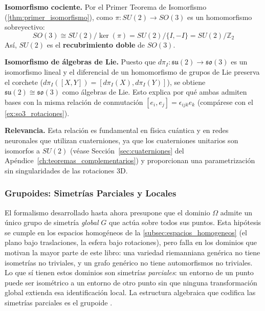\begin{example}
\textbf{Isomorfismo cociente.}
Por el Primer Teorema de Isomorfismo (\autoref{thm:primer_isomorfismo}), como $\pi: SU(2) \to SO(3)$ es un homomorfismo sobreyectivo:
\begin{equation}\label{eq:su2_z2_so3}
	SO(3) \cong SU(2)/\ker(\pi) = SU(2)/\{I, -I\} = SU(2)/\mathbb{Z}_2
\end{equation}
Así, $SU(2)$ es el \textbf{recubrimiento doble} de $SO(3)$.

\textbf{Isomorfismo de álgebras de Lie.}
Puesto que $d\pi_I: \mathfrak{su}(2) \to \mathfrak{so}(3)$ es un isomorfismo lineal y el diferencial de un homomorfismo de grupos de Lie preserva el corchete ($d\pi_I([X,Y]) = [d\pi_I(X), d\pi_I(Y)]$), se obtiene $\mathfrak{su}(2) \cong \mathfrak{so}(3)$ como álgebras de Lie. Esto explica por qué ambas admiten bases con la misma relación de conmutación $[e_i, e_j] = \epsilon_{ijk}e_k$ (compárese con el \autoref{ex:so3_rotaciones}).

\textbf{Relevancia.}
Esta relación es fundamental en física cuántica y en redes neuronales que utilizan cuaterniones, ya que los cuaterniones unitarios son isomorfos a $SU(2)$ (véase Sección~\ref{sec:cuaterniones} del Apéndice~\ref{ch:teoremas_complementarios}) y proporcionan una parametrización sin singularidades de las rotaciones 3D.
\end{example}

\subsubsection{Grupoides: Simetrías Parciales y Locales}\label{subsubsec:grupoides}

El formalismo desarrollado hasta ahora presupone que el dominio $\Omega$ admite un único grupo de simetría \emph{global} $G$ que actúa sobre todos sus puntos. Esta hipótesis se cumple en los espacios homogéneos de la \autoref{subsec:espacios_homogeneos} (el plano bajo traslaciones, la esfera bajo rotaciones), pero falla en los dominios que motivan la mayor parte de este libro: una variedad riemanniana genérica no tiene isometrías no triviales, y un grafo genérico no tiene automorfismos no triviales. Lo que sí tienen estos dominios son simetrías \emph{parciales}: un entorno de un punto puede ser isométrico a un entorno de otro punto sin que ninguna transformación global extienda esa identificación local. La estructura algebraica que codifica las simetrías parciales es el grupoide \citep{weinstein1996groupoids}.

